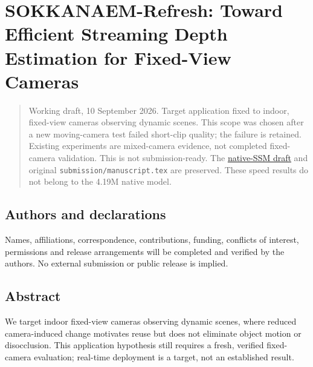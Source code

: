 \documentclass[
  10pt,
]{article}
\author{}
\date{}
\begin{document}
\section{SOKKANAEM-Refresh: Toward Efficient Streaming Depth Estimation
for Fixed-View
Cameras}\label{sokkanaem-refresh-toward-efficient-streaming-depth-estimation-for-fixed-view-cameras}

\begin{quote}
Working draft, 10 September 2026. Target application fixed to indoor,
fixed-view cameras observing dynamic scenes. This scope was chosen after
a new moving-camera test failed short-clip quality; the failure is
retained. Existing experiments are mixed-camera evidence, not completed
fixed-camera validation. This is not submission-ready. The
\href{draft_native_20260909.md}{native-SSM draft} and original
\texttt{submission/manuscript.tex} are preserved. These speed results do
not belong to the 4.19M native model.
\end{quote}

\subsection{Authors and declarations}\label{authors-and-declarations}

Names, affiliations, correspondence, contributions, funding, conflicts
of interest, permissions and release arrangements will be completed and
verified by the authors. No external submission or public release is
implied.

\subsection{Abstract}\label{abstract}

We target indoor fixed-view cameras observing dynamic scenes, where
reduced camera-induced change motivates reuse but does not eliminate
object motion or disocclusion. This application hypothesis still
requires a fresh, verified fixed-camera evaluation; real-time deployment
is a target, not an established result.
\end{document}

